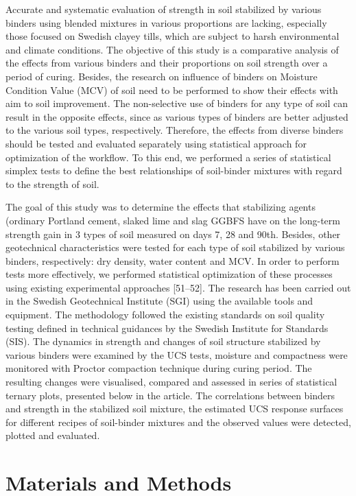 \documentclass[electronics,article,submit,pdftex,moreauthors]{Definitions/mdpi}
\begin{document}
Accurate and systematic evaluation of strength in soil stabilized by various binders using blended mixtures in various proportions are lacking, especially those focused on Swedish clayey tills, which are subject to harsh environmental and climate conditions. The objective of this study is a comparative analysis of the effects from various binders and their proportions on soil strength over a period of curing. Besides, the research on influence of binders on Moisture Condition Value (MCV) of soil need to be performed to show their effects with aim to soil improvement. The non-selective use of binders for any type of soil can result in the opposite effects, since as various types of binders are better adjusted to the various soil types, respectively. Therefore, the effects from diverse binders should be tested and evaluated separately using statistical approach for optimization of the workflow. To this end, we performed a series of statistical simplex tests to define the best relationships of soil-binder mixtures with regard to the strength of soil.

The goal of this study was to determine the effects that stabilizing agents (ordinary Portland cement, slaked lime and slag GGBFS have on the long-term strength gain in 3 types of soil measured on days 7, 28 and 90th. Besides, other geotechnical characteristics were tested for each type of soil stabilized by various binders, respectively: dry density, water content and MCV. In order to perform tests more effectively, we performed statistical optimization of these processes using existing experimental approaches [51–52]. The research has been carried out in the Swedish Geotechnical Institute (SGI) using the available tools and equipment. The methodology followed the existing standards on soil quality testing defined in technical guidances by the Swedish Institute for Standards (SIS). The dynamics in strength and changes of soil structure stabilized by various binders were examined by the UCS tests, moisture and compactness were monitored with Proctor compaction technique during curing period. The resulting changes were visualised, compared and assessed in series of statistical ternary plots, presented below in the article. The correlations between binders and strength in the stabilized soil mixture, the estimated UCS response surfaces for different recipes of soil-binder mixtures and the observed values were detected, plotted and evaluated.
	
\section{Materials and Methods}
\end{document}
